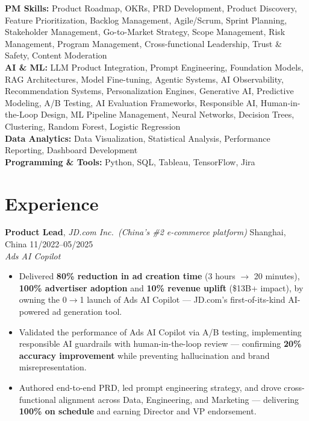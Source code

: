 \documentclass[10pt, letterpaper]{article}
\begin{document}
\textbf{PM Skills:} Product Roadmap, OKRs, PRD Development, Product Discovery, Feature Prioritization, Backlog Management, Agile/Scrum, Sprint Planning, Stakeholder Management, Go-to-Market Strategy, Scope Management, Risk Management, Program Management, Cross-functional Leadership, Trust \& Safety, Content Moderation\\
\textbf{AI \& ML:} LLM Product Integration, Prompt Engineering, Foundation Models, RAG Architectures, Model Fine-tuning, Agentic Systems, AI Observability, Recommendation Systems, Personalization Engines, Generative AI, Predictive Modeling, A/B Testing, AI Evaluation Frameworks, Responsible AI, Human-in-the-Loop Design, ML Pipeline Management, Neural Networks, Decision Trees, Clustering, Random Forest, Logistic Regression\\
\textbf{Data Analytics:} Data Visualization, Statistical Analysis, Performance Reporting, Dashboard Development\\
\textbf{Programming \& Tools:} Python, SQL, Tableau, TensorFlow, Jira\\

\section{Experience}

\textbf{Product Lead}, \textit{JD.com Inc.\ (China's \#2 e-commerce platform)} \hfill Shanghai, China \textbar{} 11/2022--05/2025\\
\textit{Ads AI Copilot}
\begin{itemize}
    \item Delivered \textbf{80\% reduction in ad creation time} (3 hours $\rightarrow$ 20 minutes), \textbf{100\% advertiser adoption} and \textbf{10\% revenue uplift} (\$13B+ impact), by owning the 0$\rightarrow$1 launch of Ads AI Copilot --- JD.com's first-of-its-kind AI-powered ad generation tool.
    \item Validated the performance of Ads AI Copilot via A/B testing, implementing responsible AI guardrails with human-in-the-loop review --- confirming \textbf{20\% accuracy improvement} while preventing hallucination and brand misrepresentation.
    \item Authored end-to-end PRD, led prompt engineering strategy, and drove cross-functional alignment across Data, Engineering, and Marketing --- delivering \textbf{100\% on schedule} and earning Director and VP endorsement.
\end{itemize}
\end{document}
